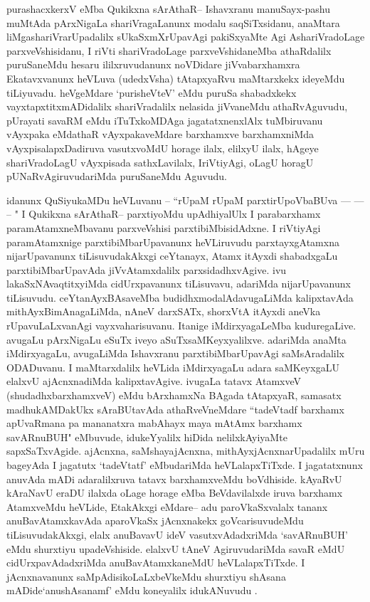 \begin{artha}
purashacxkerxV eMba Qukikxna sArAthaR-- Ishavxranu manuSayx-pashu muMtAda pArxNigaLa shariVragaLanunx modalu saqSiTxsidanu, anaMtara liMgashariVrarUpadalilx sUkaSxmXrUpavAgi pakiSxyaMte Agi AshariVradoLage parxveVshisidanu, I riVti shariVradoLage parxveVshidaneMba athaRdalilx puruSaneMdu hesaru ililxruvudanunx noVDidare jiVvabarxhamxra Ekatavxvanunx heVLuva (udedxVsha) tAtapxyaRvu maMtarxkekx ideyeMdu tiLiyuvadu. heVgeMdare `purisheVteV' eMdu puruSa shabadxkekx vayxtapxtitxmADidalilx shariVradalilx nelasida jiVvaneMdu athaRvAguvudu, pUrayati savaRM eMdu iTuTxkoMDAga jagatatxnenxlAlx tuMbiruvanu vAyxpaka eMdathaR vAyxpakaveMdare barxhamxve barxhamxniMda vAyxpisalapxDadiruva vasutxvoMdU horage ilalx, elilxyU ilalx, hAgeye shariVradoLagU vAyxpisada sathxLavilalx, IriVtiyAgi, oLagU horagU pUNaRvAgiruvudariMda puruSaneMdu Aguvudu.  

idanunx  QuSiyukaMDu heVLuvanu {\rm --} ``rUpaM rUpaM parxtirUpoV\-baBUva  {\rm ---}  {\rm ---} -- " I Qukikxna sArAthaR-- parxtiyoMdu upAdhiyalUlx I para\-barxhamx paramAtamxneMbavanu parxveVshisi parxtibiMbisidAdxne. I riVtiyAgi paramAtamxnige parxtibiMbarUpavanunx heVLiruvudu parxtayxgAtamxna nijarUpavanunx tiLisuvudakAkxgi ceYtanayx, Atamx itAyxdi shabadxgaLu parxtibiMbarUpavAda jiVvAtamxdalilx parxsidadhxvAgive. ivu lakaSxNAvaqtitxyiMda cidUrxpavanunx tiLisuvavu, adariMda nijarUpavanunx tiLisuvudu. ceYtanAyxBAsaveMba budidhxmodalAdavugaLiMda kalipxtavAda mithAyxBimAnagaLiMda, nAneV darxSATx, shorxVtA itAyxdi aneVka rUpavuLaLxvanAgi vayxvaharisuvanu. Itanige iMdirxyagaLeMba kuduregaLive. avugaLu pArxNigaLu eSuTx iveyo aSuTxsaMKeyxyalilxve. adariMda anaMta iMdirxyagaLu, avugaLiMda Ishavxranu parxtibiMbarUpavAgi saMsAradalilx ODADuvanu. I maMtarxdalilx heVLida iMdirxyagaLu adara saMKeyxgaLU elalxvU ajAcnxnadiMda kalipxtavAgive. ivugaLa tatavx AtamxveV (shudadhxbarxhamxveV) eMdu bArxhamxNa BAgada tAtapxyaR, samasatx madhukAMDakUkx sAraBUtavAda athaRveVneMdare ``tadeVtadf barxhamx apUvaRmana pa mananatxra mabAhayx maya mAtAmx barxhamx savARnuBUH" eMbuvude, idukeYyalilx hiDida nelilxkAyiyaMte sapxSaTxvAgide. ajAcnxna, saMshayajAcnxna, mithAyxjAcnxnarUpadalilx mUru bageyAda I jagatutx `tadeVtatf' eMbudariMda heVLalapxTiTxde. I jagatatxnunx anuvAda mADi adaralilxruva tatavx barxhamxveMdu boVdhiside. kAyaRvU kAraNavU eraDU ilalxda oLage horage eMba BeVdavilalxde iruva barxhamx AtamxveMdu heVLide, EtakAkxgi eMdare-- adu paroVkaSxvalalx tananx anuBavAtamxkavAda aparoVkaSx jAcnxnakekx goVcarisuvudeMdu tiLisuvudakAkxgi, elalx anuBavavU ideV vasutxvAdadxriMda `savARnuBUH' eMdu shurxtiyu upadeVshiside. elalxvU tAneV AgiruvudariMda savaR eMdU cidUrxpavAdadxriMda anuBavAtamxkaneMdU heVLalapxTiTxde. I jAcnxnavanunx saMpAdisikoLaLxbeVkeMdu shurxtiyu shAsana mADide`anushAsanamf' eMdu koneyalilx idukANuvudu .
\end{artha}

